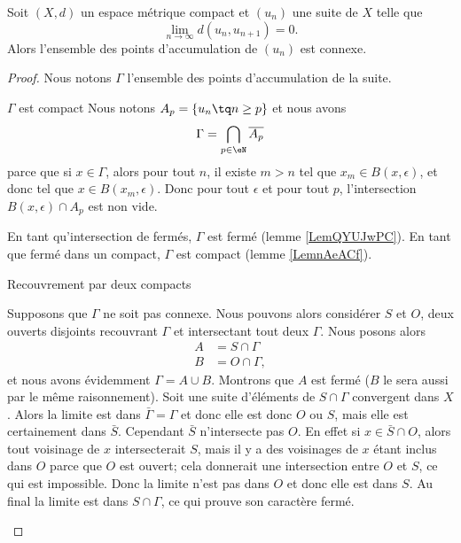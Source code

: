 \begin{proposition} \label{PropLHWACDU}
    Soit \( (X,d)\) un espace métrique compact et \( (u_n)\) une suite de \( X\) telle que
    \begin{equation}
        \lim_{n\to \infty} d(u_n,u_{n+1})=0.
    \end{equation}
    Alors l'ensemble des points d'accumulation de \( (u_n)\) est connexe.
\end{proposition}

\begin{proof}
    Nous notons \( \Gamma\) l'ensemble des points d'accumulation de la suite.
    \begin{subproof}
    \item[\( \Gamma\) est compact]
        Nous notons \( A_p=\{ u_n\tq n\geq p \}\) et nous avons
        \begin{equation}
            \Gamma=\bigcap_{p\in \eN}\overline{ A_p }
        \end{equation}
        parce que si \( x\in\Gamma\), alors pour tout \( n\), il existe \( m>n\) tel que \( x_m\in B(x,\epsilon)\), et donc tel que \( x\in B(x_m,\epsilon)\). Donc pour tout \( \epsilon\) et pour tout \( p\), l'intersection \( B(x,\epsilon)\cap A_p\) est non vide.

        En tant qu'intersection de fermés, \( \Gamma\) est fermé (lemme \ref{LemQYUJwPC}). En tant que fermé dans un compact, \( \Gamma\) est compact (lemme \ref{LemnAeACf}).

    \item[Recouvrement par deux compacts]

        Supposons que \( \Gamma\) ne soit pas connexe. Nous pouvons alors considérer \( S\) et \( O\), deux ouverts disjoints recouvrant \( \Gamma\) et intersectant tout deux \( \Gamma\). Nous posons alors
        \begin{subequations}
            \begin{align}
                A&=S\cap\Gamma\\
                B&=O\cap\Gamma,
            \end{align}
        \end{subequations}
        et nous avons évidemment \( \Gamma=A\cup B\). Montrons que \( A\) est fermé (\( B\) le sera aussi par le même raisonnement). Soit une suite d'éléments de \( S\cap \Gamma\) convergent dans \( X\). Alors la limite est dans \( \bar\Gamma=\Gamma\) et donc elle est donc \( O\) ou \( S\), mais elle est certainement dans \( \bar S\). Cependant \( \bar S\) n'intersecte pas \( O\). En effet si \( x\in \bar S\cap O\), alors tout voisinage de \( x\) intersecterait \( S\), mais il y a des voisinages de \( x\) étant inclus dans \( O\) parce que \( O\) est ouvert; cela donnerait une intersection entre \( O\) et \( S\), ce qui est impossible. Donc la limite n'est pas dans \( O\) et donc elle est dans \( S\). Au final la limite est dans \( S\cap \Gamma\), ce qui prouve son caractère fermé. 


\end{subproof}
\end{proof}
